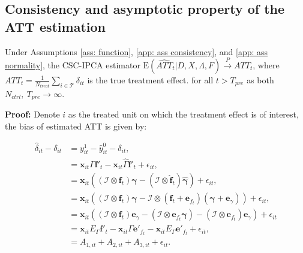 \documentclass[12pt]{article}
\begin{document}
\subsection{Consistency and asymptotic property of the ATT estimation}
\begin{theorem}
\label{thm: bias}
Under Assumptions \ref{ass: function}, \ref{app: ass consistency}, and \ref{app: ass normality}, the CSC-IPCA estimator $\mathrm{E}\left(\widehat{ATT}_{t} | D, X, \Lambda, F\right) \xrightarrow{P} ATT_{t}$, where $ATT_{t} = \frac{1}{N_{treat}}\sum_{i \in \mathcal{T}}\delta_{it}$ is the true treatment effect. for all $t > T_{pre}$ as both $N_{ctrl}, \ T_{pre} \to \infty$.
\end{theorem}

\textbf{Proof:} Denote $i$ as the treated unit on which the treatment effect is of interest, the bias of estimated ATT is given by:

\begin{equation*}
\begin{aligned}
\hat{\delta}_{it} - \delta_{it} &= y_{it}^1 - \hat{y}_{it}^0 - \delta_{it}, \\    
&= \textbf{x}_{it}\Gamma \mathbf{f}'_t - \textbf{x}_{it}\hat{\Gamma}\hat{\mathbf{f}}'_t + \epsilon_{it}, \\
&= \textbf{x}_{it}\left( \left(\mathcal{I}\otimes \mathbf{f}_t \right) \bm{\gamma} - (\mathcal{I}\otimes \hat{\mathbf{f}}_t ) \hat{\bm{\gamma}} \right) + \epsilon_{it}, \\
&= \textbf{x}_{it}\left( \left(\mathcal{I}\otimes \mathbf{f}_t \right) \bm{\gamma} - \mathcal{I}\otimes (\mathbf{f}_t + \mathbf{e}_{f_t}) (\bm{\gamma}+\textbf{e}_{\gamma}) \right) + \epsilon_{it}, \\
&= \textbf{x}_{it}\left( (\mathcal{I} \otimes \mathbf{f}_t) \textbf{e}_{\gamma} - (\mathcal{I} \otimes \mathbf{e}_{f_t} \bm{\gamma}) - (\mathcal{I} \otimes \mathbf{e}_{f_t}) \textbf{e}_{\gamma} \right) + \epsilon_{it}\\
&= \textbf{x}_{it}E_{\Gamma}\mathbf{f}'_t - \textbf{x}_{it}\Gamma \mathbf{e}'_{f_t} - \textbf{x}_{it}E_{\Gamma}\mathbf{e}'_{f_t} + \epsilon_{it}, \\
&= A_{1,it} + A_{2,it} + A_{3,it} + \epsilon_{it}.
\end{aligned}
\end{equation*}
\end{document}
